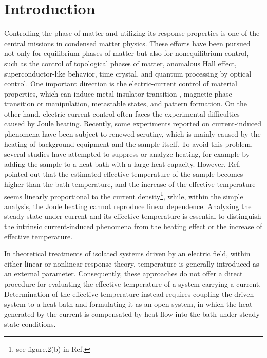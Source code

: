 \documentclass[a4paper, amsfonts, amssymb, amsmath, reprint, showkeys, nofootinbib, twoside,superscriptaddress, prb]{revtex4-2}
\begin{document}
\section{Introduction}
Controlling the phase of matter and utilizing its response properties is one of the central missions in condensed matter physics. These efforts have been pursued not only for equilibrium phases of matter but also for nonequilibrium control, such as the control of topological phases of matter\cite{Wang2013-rc, Wintersperger2020-gi}, anomalous Hall effect\cite{McIver2020-dy}, superconductor-like behavior\cite{Fausti2011-wl, Mitrano2016-pc, Liu2020-mx, Budden2021-wo, Buzzi2021-zm, Fava2024-pi}, time crystal\cite{Choi2017-ju, Zhang2017-dl, Liu2025-dg}, and quantum processing by optical control\cite{Tomita2017-oo, Noel2022-uq, Google-Quantum-AI-and-Collaborators2023-cr}. 
One important direction is the electric-current control of material properties, which can induce metal-insulator transition
\cite{Zhang2019-qb, Suen2024-id}, magnetic phase transition or manipulation\cite{Jain2006-om, Wadley2016-fj, Grzybowski2017-zi, Hrabec2017-as, Bodnar2018-sx, Arpaci2021-si, Reimers2023-kv, Zheng2024-in, Shimizu2025-fx}, metastable states\cite{Huber2025-ro}, and pattern formation\cite{Gauquelin2023-in}. 
On the other hand, electric-current control often faces the experimental difficulties caused by Joule heating. Recently, some experiments reported on current-induced phenomena have been  subject to renewed scrutiny\cite{Kitaori2021-jc, Furuta2024-hy, Cao2025-uj, Zhang2025-vc}, which is mainly caused by the heating of background equipment and the sample itself. To avoid this problem, several studies have attempted to suppress or analyze heating\cite{Mattoni2020-bh, Zhang2019-qb, Curcio2023-rl, Mattoni2024-sh, Ootsuki2025-em, Fang2025-lh, Liu2026-us}, for example by adding the sample to a heat bath with a large heat capacity. However, Ref.\cite{Ootsuki2025-em} pointed out that the estimated effective temperature of the sample becomes higher than the bath temperature, and the increase of the effective temperature seems linearly proportional to the current density\footnote{see figure.2(b) in Ref.\cite{Ootsuki2025-em}}, while, within the simple analysis, the Joule heating cannot reproduce linear dependence\cite{Supple}. Analyzing the steady state under current and its effective temperature is essential to distinguish the intrinsic current-induced phenomena from the heating effect or the increase of effective temperature.

In theoretical treatments of isolated systems driven by an electric field, within either linear or nonlinear response theory, temperature is generally introduced as an external parameter. Consequently, these approaches do not offer a direct procedure for evaluating the effective temperature of a system carrying a current. Determination of the effective temperature instead requires coupling the driven system to a heat bath and formulating it as an open system, in which the heat generated by the current is compensated by heat flow into the bath under steady-state conditions.
\end{document}
